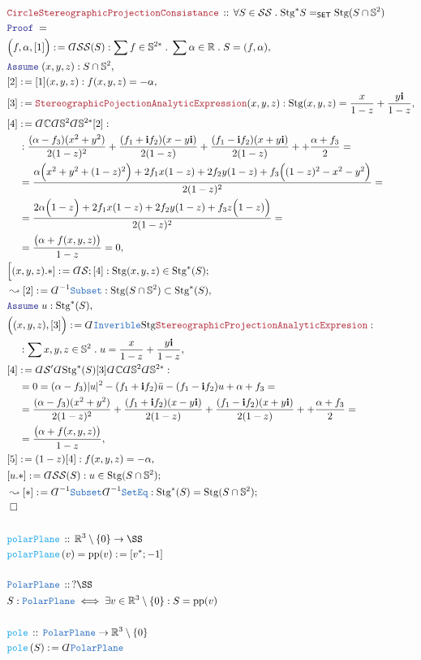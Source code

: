 \documentclass[12pt]{scrartcl}
\newcommand{\TYPE}[1]{\textcolor{NavyBlue}{\mathtt{#1}}}
\newcommand{\FUNC}[1]{\textcolor{Cerulean}{\mathtt{#1}}}
\newcommand{\LOGIC}[1]{\textcolor{Blue}{\mathtt{#1}}}
\newcommand{\THM}[1]{\textcolor{Maroon}{\mathtt{#1}}}
\renewcommand{\.}{\; . \;}
\newcommand{\de}{: \kern 0.1pc =}
\newcommand{\Act}[1]{\left( #1 \right)}
\newcommand{\Theorem}[2]{& \THM{#1} \, :: \, #2 \\ & \Proof = \\ }
\newcommand{\DeclareType}[2]{& \TYPE{#1} \, :: \, #2 \\}
\newcommand{\DefineType}[3]{& #1 : \TYPE{#2} \iff #3 \\}
\newcommand{\DeclareFunc}[2]{& \FUNC{#1} \, :: \, #2 \\}
\newcommand{\DefineFunc}[3]{&  \FUNC{#1}\Act{#2} \de #3 \\}
\newcommand{\DefineNamedFunc}[4]{&  \FUNC{#1}\Act{#2} = #3 \de #4 \\}
\newcommand{\NewLine}{\\ & \kern 1pc}
\newcommand{\Page}[1]{ \begin{align*} #1 \end{align*}   }
\newcommand{ \bd }{ \ByDef }
\newcommand{\Reals}{\mathbb{R} }
\newcommand{\Complex}{\mathbb{C}}
\newcommand{\Sphere}{\mathbb{S}}
\renewcommand{\i}{\mathbf{i}}
\newcommand{\Say}[3]{& #1 \de #2 : #3, \\}
\newcommand{\Conclude}[3]{& #1 \de #2 : #3; \\}
\newcommand{\Derive}[3]{& \leadsto #1 \de #2 : #3, \\}
\newcommand{\DeriveConclude}[3]{& \leadsto #1 \de #2 : #3 ; \\}
\newcommand{\Assume}[2]{& \LOGIC{Assume} \; #1 : #2, \\}
\newcommand{\QED}{\; \square}
\newcommand{\EndProof}{& \QED \\}
\newcommand{\ByDef}{\rotatebox[origin=c]{-180}{$D$}}%
\newcommand{\Proof}{\LOGIC{Proof} \; }
\newcommand{\SET}{\mathsf{SET}}
\renewcommand{\S}{\mathcal{S}}
\newcommand{\Stg}{\mathrm{Stg}}
\begin{document}
\Page{
	\Theorem{CircleStereographicProjectionConsistance}
	{
		\forall S \in \S\S \.
		\Stg^*S =_{\SET} \Stg(S \cap \Sphere^2 )
	}
	\Say{\Big(f,\alpha, [1] \Big)}{\bd \S\S(S)}{\sum f \in \Sphere^{2*} \. \sum \alpha \in \Reals \. S = (f,\alpha) }
	\Assume{(x,y,z)}{S \cap \Sphere^2}
	\Say{[2]}{[1](x,y,z)}{f(x,y,z) = -\alpha}
	\Say{[3]}{\THM{StereographicPojectionAnalyticExpression}(x,y,z)}
	{
		\Stg(x,y,z) = \frac{x}{1 - z} + \frac{y\i}{1 - z}
	}
	\Say{[4]}{\bd \Complex \bd \Sphere^{2} \bd \Sphere^{2*} [2]}
	{
		\NewLine :
		\frac{(\alpha-f_3)(x^2 + y^2)}{2(1-z)^2} +
		\frac{(f_1 + \i f_2)(x - y\i)}{2(1 - z)}  +
		\frac{(f_1 - \i f_2)(x + y\i)}{2(1 - z)}  +
		+ \frac{\alpha + f_3}{2} = \NewLine = 
		\frac{ 
			\alpha\Big(x^2 + y^2 + (1-z)^2 \Big) +
			2f_1 x(1-z)  +
			2f_2 y(1 - z) +
			f_3 \Big( (1 - z)^2 - x^2 - y^2  \Big) 
		}
		{2(1-z)^2} 
		= \NewLine = 
		\frac{ 
			2\alpha\Big( 1 - z  \Big) +
			2f_1 x(1-z)  +
			2f_2 y(1 - z) +
			f_3 z\Big( 1 - z)   \Big) 
		}
		{2(1-z)^2} 
		= \NewLine =  
		\frac{\big(\alpha + f(x,y,z)\big)}{ 1 -  z} = 0
	}
	\Conclude{\Big[(x,y,z).*]}{\bd \S; [4]}{ \Stg(x,y,z) \in \Stg^*(S) }
	\Derive{[2]}{\bd^{-1} \TYPE{Subset}}{\Stg(S \cap \Sphere^2) \subset \Stg^*(S)}
	\Assume{u}{\Stg^*(S)}
	\Say{\Big( (x,y,z), [3] \Big)}{\bd \TYPE{Inverible} \Stg \THM{StereographicProjectionAnalyticExpresion}}
	{
		\NewLine :
		\sum x,y,z \in \Sphere^2 \.  u = \frac{x}{1-z} + \frac{y\i}{1-z} 
	}
	\Say{[4]}{\bd \S' \bd \Stg^*(S) [3]\bd \Complex \bd \Sphere^2 \bd \Sphere^{2*} }
	{
		\NewLine =
		0 = (\alpha - f_3)|u|^2   - (f_1 + \i f_2)\bar u - (f_1 - \i f_2) u + \alpha + f_3 = 
		\NewLine =
		\frac{(\alpha-f_3)(x^2 + y^2)}{2(1-z)^2} +
		\frac{(f_1 + \i f_2)(x - y\i)}{2(1 - z)}  +
		\frac{(f_1 - \i f_2)(x + y\i)}{2(1 - z)}  +
		+ \frac{\alpha + f_3}{2} = \NewLine = 
		\frac{\big(\alpha + f(x,y,z)\big)}{ 1 -  z} 
	}
	\Say{[5]}{(1-z)[4]}{f(x,y,z) = -\alpha}
	\Conclude{[u.*]}{\bd \S\S(S)}{u \in \Stg(S \cap \Sphere^2)}
	\DeriveConclude{[*]}{\bd^{-1}\TYPE{Subset} \bd^{-1} \TYPE{SetEq} }
	{
		\Stg^*(S) = \Stg(S \cap \Sphere^2)
	}
	\EndProof
	\\
	\DeclareFunc{polarPlane}{\Reals^3 \setminus \{0\} \to \SS }
	\DefineNamedFunc{polarPlane}{v}{\mathrm{pp}(v)}{[v^*;-1]}
	\\
	\DeclareType{PolarPlane}{?\SS}
	\DefineType{S}{PolarPlane}{\exists v \in \Reals^3 \setminus \{0\} : S = \mathrm{pp}(v)}
	\\
	\DeclareFunc{pole}{\TYPE{PolarPlane} \to \Reals^3 \setminus \{0\}}
	\DefineFunc{pole}{S}{\bd \TYPE{PolarPlane}}
}
\end{document}

